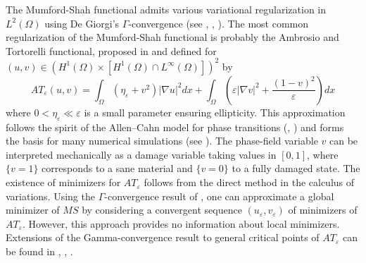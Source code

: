 \documentclass[reqno,12pt,twoside]{amsart}
\numberwithin{equation}{section} \numberwithin{theorem}{section}
\numberwithin{proposition}{section} \numberwithin{lemma}{section}
\numberwithin{corollary}{section}
\numberwithin{definition}{section} \numberwithin{remark}{section}
\begin{document}
The Mumford-Shah functional admits various variational regularization in $L^2(\Omega)$ using De Giorgi’s $\Gamma$-convergence (see \cite{AT90}, \cite{AT92}, \cite{G98}).
The most common regularization of the Mumford-Shah functional is probably the Ambrosio and Tortorelli functional, proposed in \cite{AT92} and defined for $(u,v) \in (H^1(\Omega) \times [H^1(\Omega)\cap L^\infty(\Omega)])^2$ by 
\begin{equation}\label{AT}
AT_\varepsilon (u,v) = \int_\Omega (\eta_\varepsilon + v^2) |\nabla u|^2 dx + \int_\Omega \left(\varepsilon |\nabla v|^2 + \frac{(1-v)^2}{\varepsilon}\right)dx
\end{equation}
where $0 < \eta_\varepsilon \ll \varepsilon$ is a small parameter ensuring ellipticity. This approximation follows the spirit of the Allen--Cahn model for phase transitions (\cite{M87}, \cite{S88}) and forms the basis for many numerical simulations (see \cite{BFM08}).
The phase-field variable $v$ can be interpreted mechanically as a damage variable taking values in $[0,1]$, where $\{v=1\}$ corresponds to a sane material and $\{v=0\}$ to a fully damaged state. The existence of minimizers for $AT_\varepsilon$ follows from the direct method in the calculus of variations. Using the $\Gamma$-convergence result of \cite{AT92}, one can approximate a global minimizer of $MS$ by considering a convergent sequence $(u_\varepsilon, v_\varepsilon)$ of minimizers of $AT_\varepsilon$.  However, this approach provides no information about local minimizers. Extensions of the Gamma-convergence result to general critical points of $AT_\varepsilon$ can be found in \cite{FLS09}, \cite{BMRa23}, \cite{BRR26}. 

\medskip
\end{document}
